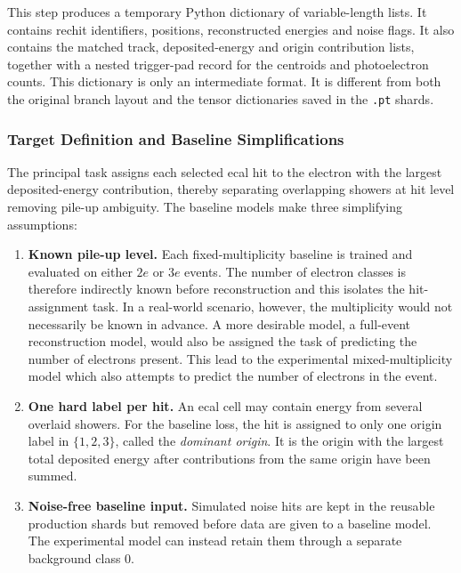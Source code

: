 This step produces a temporary Python dictionary of variable-length lists.
It contains \gls{rechit} identifiers, positions, reconstructed energies and noise
flags. It also contains the matched track, deposited-energy and origin
contribution lists, together with a nested trigger-pad record for the
centroids and photoelectron counts. This dictionary is only an intermediate
format. It is different from both the original branch layout and the tensor
dictionaries saved in the \texttt{.pt} shards.

\subsubsection{Target Definition and Baseline Simplifications}
\label{sec:method_targets}

The principal task assigns each selected \gls{ecal} hit to the electron with
the largest deposited-energy contribution, thereby separating overlapping
showers at hit level removing pile-up ambiguity. The baseline models make three simplifying assumptions:

\begin{enumerate}
    \item \textbf{Known pile-up level.} Each fixed-multiplicity baseline is
    trained and evaluated on either \(2e\) or \(3e\) events. The number of
    electron classes is therefore indirectly known before reconstruction and this isolates the hit-assignment task. In a real-world scenario, however, the multiplicity would not necessarily be known in advance. A more desirable model, a full-event reconstruction model, would also be assigned the task of predicting the number of electrons present. This lead to the experimental mixed-multiplicity model which also attempts to predict the number of electrons in the event.

    \item \textbf{One hard label per hit.} An \gls{ecal} cell may contain
    energy from several overlaid showers. For the baseline loss, the hit is
    assigned to only one origin label in \(\{1,2,3\}\), called the
    \textit{dominant origin}. It is the origin with the largest total
    deposited energy after contributions from the same origin have been summed.

    \item \textbf{Noise-free baseline input.} Simulated noise hits are kept in
    the reusable production shards but removed before data are given to a
    baseline model. The experimental model can instead retain them through a
    separate background class \(0\).
\end{enumerate}

